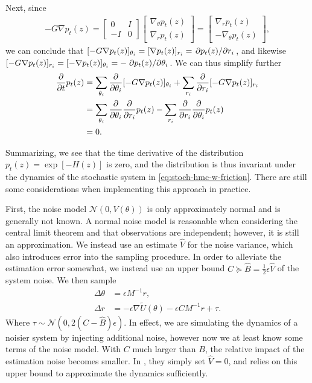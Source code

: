 Next, since 
\begin{align}
    -G\nabla p_t(z) = \begin{bmatrix}0 & I \\ -I & 0 \end{bmatrix}
    \begin{bmatrix}
        \nabla_\theta p_t(z) \\ 
        \nabla_r p_t(z)
    \end{bmatrix} = \begin{bmatrix}
        \nabla_r p_t(z) \\
        -\nabla_\theta p_t(z) 
    \end{bmatrix},
\end{align}
we can conclude that $[-G\nabla p_t(z)]_{\theta_i} = [\nabla p_t(z)]_{r_i} = \pdv*{p_t(z)}{r_i}$, and likewise $[-G\nabla p_t(z)]_{r_i} = [-\nabla p_t(z)]_{\theta_i} =-\pdv*{p_t(z)}{\theta_i}$.
We can thus simplify further
\begin{align}
    \pdv{t} p_t(z) 
    &= \sum_{\theta_i} \pdv{\theta_i} [ -G\nabla p_t(z)]_{\theta_i}
    + \sum_{r_i} \pdv{r_i} [ -G\nabla p_t(z)]_{r_i} \\
    &= \sum_{\theta_i} \pdv{\theta_i} \pdv{r_i} p_t(z)
    - \sum_{r_i} \pdv{r_i} \pdv{\theta_i} p_t(z)\\
    &= 0.
\end{align}

Summarizing, we see that the time derivative of the distribution $p_t(z)=\exp[-H(z)]$ is zero, and the distribution is thus invariant under the dynamics of the stochastic system in \cref{eq:stoch-hmc-w-friction}. 
There are still some considerations when implementing this approach in practice. 

First, the noise model $\mathcal{N}(0, V(\theta))$ is only approximately normal and is generally not known.
A normal noise model is reasonable when considering the central limit theorem and that observations are independent; however, it is still an approximation.
We instead use an estimate $\hat{V}$ for the noise variance, which also introduces error into the sampling procedure. 
In order to alleviate the estimation error somewhat, we instead use an upper bound $C \succeq \hat{B}= \frac{1}{2}\epsilon \hat{V}$ of the system noise.
We then sample
\begin{align}
    \Delta \theta &=  \epsilon M^{-1} r,\\
    \Delta r &=  -\epsilon\nabla\tilde{U}(\theta) - \epsilon CM^{-1}r  + \tau.
\end{align}
Where $\tau\sim  \mathcal{N}(0, 2(C - \hat{B})\epsilon)$.
In effect, we are simulating the dynamics of a noisier system by injecting additional noise, however now we at least know some terms of the noise model.
With $C$ much larger than $B$, the relative impact of the estimation noise becomes smaller. 
In \autocite{chen_stochastic_2014}, they simply set $\hat{V} = 0$, and relies on this upper bound to approximate the dynamics sufficiently.  


